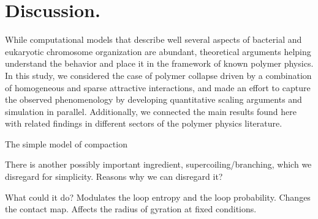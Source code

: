 \documentclass[
preprint,
a4paper,
12pt,
superscriptaddress,
pre]{revtex4}
\begin{document}




\section{Discussion. }
\label{sec:Disc}


While computational models that describe well several aspects of
bacterial and eukaryotic chromosome organization are abundant,
theoretical arguments helping understand the behavior and place it in
the framework of known polymer physics.  
In this study, we considered the case of polymer collapse driven by a
combination of homogeneous and sparse attractive interactions, and
made an effort to capture the observed phenomenology by developing
quantitative scaling arguments and simulation in parallel. 
Additionally, we connected the main results found here with related
findings in different sectors of the polymer physics literature. 

The simple model of compaction



%


There is another possibly important ingredient,
supercoiling/branching, which we disregard for simplicity. Reasons why
we can disregard it?

What could it do? Modulates the loop entropy and the loop
probability. Changes the contact map. Affects the radius of gyration
at fixed conditions.

% 
%
%
\end{document}

